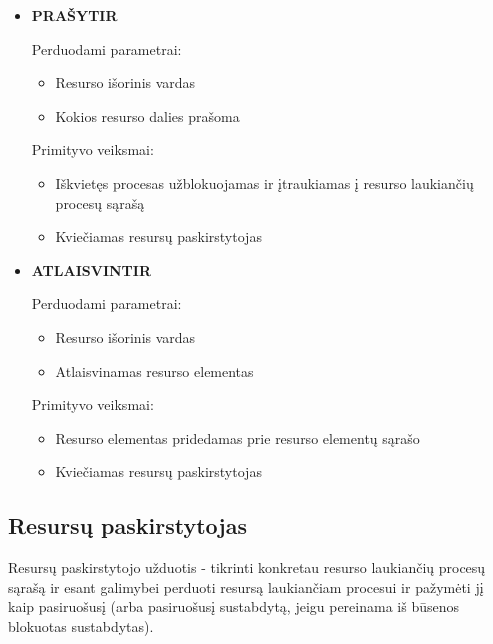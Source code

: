 \documentclass{scrartcl}
\begin{document}
\begin{itemize}
        \item \textbf{PRAŠYTIR}
          \par
          Perduodami parametrai:
          \begin{itemize}
            \item Resurso išorinis vardas
            \item Kokios resurso dalies prašoma
          \end{itemize}
          Primityvo veiksmai:
          \begin{itemize}
            \item Iškvietęs procesas užblokuojamas ir įtraukiamas į resurso laukiančių procesų sąrašą
            \item Kviečiamas resursų paskirstytojas
          \end{itemize}

        \item \textbf{ATLAISVINTIR}
          \par
          Perduodami parametrai:
          \begin{itemize}
            \item Resurso išorinis vardas
            \item Atlaisvinamas resurso elementas
          \end{itemize}
          Primityvo veiksmai:
          \begin{itemize}
            \item Resurso elementas pridedamas prie resurso elementų sąrašo
            \item Kviečiamas resursų paskirstytojas
          \end{itemize}
      \end{itemize}
      \subsection{Resursų paskirstytojas}
        Resursų paskirstytojo užduotis - tikrinti konkretau resurso laukiančių procesų sąrašą ir esant galimybei perduoti resursą laukiančiam procesui ir pažymėti jį kaip pasiruošusį (arba pasiruošusį sustabdytą, jeigu pereinama iš būsenos blokuotas sustabdytas).
\end{document}
